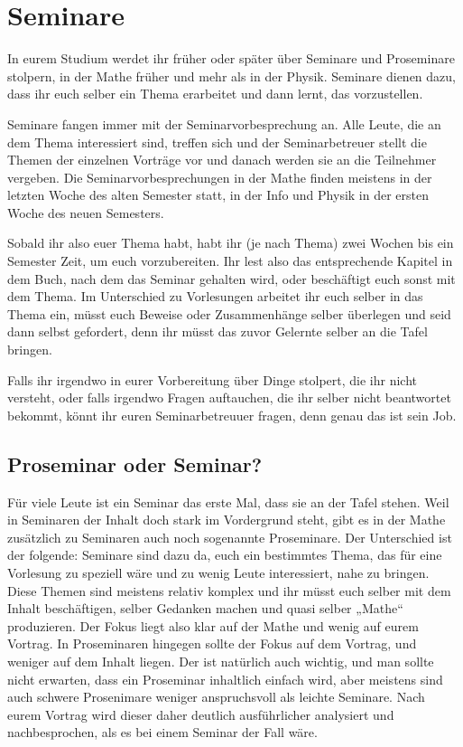 \section{Seminare}

In eurem Studium werdet ihr früher oder später über Seminare und Proseminare stolpern, in der Mathe früher und mehr als in der Physik. Seminare dienen dazu, dass ihr euch selber ein Thema erarbeitet und dann lernt, das vorzustellen.

Seminare fangen immer mit der Seminarvorbesprechung an. Alle Leute, die an dem Thema interessiert sind, treffen sich und der Seminarbetreuer stellt die Themen der einzelnen Vorträge vor und danach werden sie an die Teilnehmer vergeben. Die Seminarvorbesprechungen in der Mathe finden meistens in der letzten Woche des alten Semester statt, in der Info und Physik in der ersten Woche des neuen Semesters.

Sobald ihr also euer Thema habt, habt ihr (je nach Thema) zwei Wochen bis ein Semester Zeit, um euch vorzubereiten. Ihr lest also das entsprechende Kapitel in dem Buch, nach dem das Seminar gehalten wird, oder beschäftigt euch sonst mit dem Thema. Im Unterschied zu Vorlesungen arbeitet ihr euch selber in das Thema ein, müsst euch Beweise oder Zusammenhänge selber überlegen und seid dann selbst gefordert, denn ihr müsst das zuvor Gelernte selber an die Tafel bringen.

Falls ihr irgendwo in eurer Vorbereitung über Dinge stolpert, die ihr nicht versteht, oder falls irgendwo Fragen auftauchen, die ihr selber nicht beantwortet bekommt, könnt ihr euren Seminarbetreuuer fragen, denn genau das ist sein Job.

\subsection{Proseminar oder Seminar?}
Für viele Leute ist ein Seminar das erste Mal, dass sie an der Tafel stehen. Weil in Seminaren der Inhalt doch stark im Vordergrund steht, gibt es in der Mathe zusätzlich zu Seminaren auch noch sogenannte Proseminare. Der Unterschied ist der folgende: Seminare sind dazu da, euch ein bestimmtes Thema, das für eine Vorlesung zu speziell wäre und zu wenig Leute interessiert, nahe zu bringen. Diese Themen sind meistens relativ komplex und ihr müsst euch selber mit dem Inhalt beschäftigen, selber Gedanken machen und quasi selber „Mathe“ produzieren. Der Fokus liegt also klar auf der Mathe und wenig auf eurem Vortrag. In Proseminaren hingegen sollte der Fokus auf dem Vortrag, und weniger auf dem Inhalt liegen. Der ist natürlich auch wichtig, und man sollte nicht erwarten, dass ein Proseminar inhaltlich einfach wird, aber meistens sind auch schwere Prosenimare weniger anspruchsvoll als leichte Seminare. Nach eurem Vortrag wird dieser daher deutlich ausführlicher analysiert und nachbesprochen, als es bei einem Seminar der Fall wäre.

